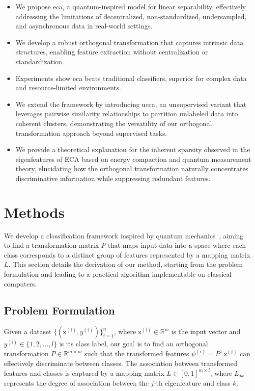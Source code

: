 \documentclass[lettersize,journal]{IEEEtran}
\begin{document}
\begin{itemize}
\item We propose \Gls{eca}, a quantum-inspired model for linear separability, effectively addressing the limitations of decentralized, non-standardized, undersampled, and asynchronous data in real-world settings.

\item We develop a robust orthogonal transformation that captures intrinsic data structures, enabling feature extraction without centralization or standardization.

\item Experiments show \Gls{eca} beats traditional classifiers, superior for complex data and resource-limited environments.
\item We extend the framework by introducing \Gls{ueca}, an unsupervised variant that leverages pairwise similarity relationships to partition unlabeled data into coherent clusters, demonstrating the versatility of our orthogonal transformation approach beyond supervised tasks.
\item We provide a theoretical explanation for the inherent sparsity observed in the eigenfeatures of ECA based on energy compaction and quantum measurement theory, elucidating how the orthogonal transformation naturally concentrates discriminative information while suppressing redundant features.

\end{itemize}


\section{Methods}
We develop a classification framework inspired by quantum mechanics~\cite{ciliberto2018quantum, schuld2015introduction}, aiming to find a transformation matrix \( P \) that maps input data into a space where each class corresponds to a distinct group of features represented by a mapping matrix \( L \). This section details the derivation of our method, starting from the problem formulation and leading to a practical algorithm implementable on classical computers.
\subsection{Problem Formulation}
Given a dataset \( \{ (\mathsf{x}^{(i)}, y^{(i)}) \}_{i=1}^n \), where \( \mathsf{x}^{(i)} \in \mathbb{R}^m \) is the input vector and \( y^{(i)} \in \{1, 2, \dots, l\} \) is its class label, our goal is to find an orthogonal transformation \( P \in \mathbb{R}^{m \times m} \) such that the transformed features \( \psi^{(i)} = P^\top \mathsf{x}^{(i)} \) can effectively discriminate between classes. The association between transformed features and classes is captured by a mapping matrix \( L \in [0,1]^{m \times l} \), where \( L_{jk} \) represents the degree of association between the \( j \)-th eigenfeature and class \( k \).
\end{document}
